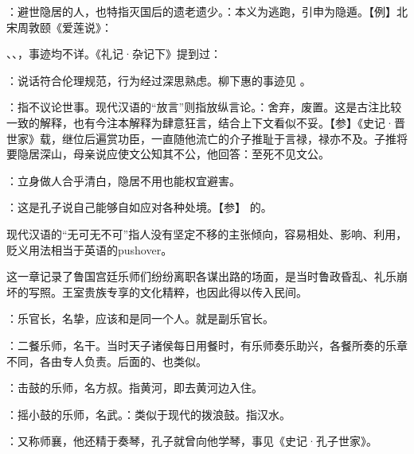 {
\item {}：避世隐居的人，也特指灭国后的遗老遗少。：本义为逃跑，引申为隐遁。【例】北宋周敦颐《爱莲说》：
\item {}、、，事迹均不详。《礼记·杂记下》提到过：
\item {}：说话符合伦理规范，行为经过深思熟虑。柳下惠的事迹见 。
\item {}：指不议论世事。现代汉语的“放言”则指放纵言论。：舍弃，废置。这是古注比较一致的解释，也有今注本解释为肆意狂言，结合上下文看似不妥。【参】《史记·晋世家》载，继位后遍赏功臣，一直随他流亡的介子推耻于言禄，禄亦不及。子推将要隐居深山，母亲说应使文公知其不公，他回答：至死不见文公。
\item {}：立身做人合乎清白，隐居不用也能权宜避害。
\item {}：这是孔子说自己能够自如应对各种处境。【参】 的。%

现代汉语的“无可无不可”指人没有坚定不移的主张倾向，容易相处、影响、利用，贬义用法相当于英语的pushover。 %
}
{}


{
这一章记录了鲁国宫廷乐师们纷纷离职各谋出路的场面，是当时鲁政昏乱、礼乐崩坏的写照。王室贵族专享的文化精粹，也因此得以传入民间。
\begin{lyitemize}
\item {}：乐官长，名挚，应该和是同一个人。就是副乐官长。
\item {}：二餐乐师，名干。当时天子诸侯每日用餐时，有乐师奏乐助兴，各餐所奏的乐章不同，各由专人负责。后面的、也类似。
\item {}：击鼓的乐师，名方叔。指黄河，即去黄河边入住。
\item {}：摇小鼓的乐师，名武。：类似于现代的拨浪鼓。指汉水。
\item {}：又称师襄，他还精于奏琴，孔子就曾向他学琴，事见《史记·孔子世家》。
\end{lyitemize}
}
{}


